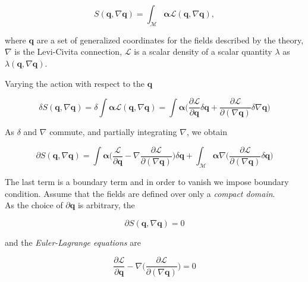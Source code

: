 {    \begin{equation}
    S(\boldsymbol{q}, \nabla\boldsymbol{q}) = \int_{\mathcal{M}}\boldsymbol{\alpha}\mathcal{L}(\boldsymbol{q}, \nabla\boldsymbol{q}),
    \end{equation}
    
    where $\boldsymbol{q}$ are a set of generalized coordinates for the fields described by the theory, $\nabla$ is the Levi-Civita connection, $\mathcal{L}$ is a scalar density of a scalar quantity $\lambda$ as $\lambda(\boldsymbol{q},\nabla\boldsymbol{q})$. 
    
    Varying the action with respect to the $\boldsymbol{q}$
    
    \begin{equation}
    \delta S(\boldsymbol{q}, \nabla\boldsymbol{q}) = \delta\int\boldsymbol{\alpha}\mathcal{L}(\boldsymbol{q}, \nabla\boldsymbol{q}) = \int\boldsymbol{\alpha}\Big(\frac{\partial\mathcal{L}}{\partial\boldsymbol{q}}\delta\boldsymbol{q}+\frac{\partial\mathcal{L}}{\partial(\nabla\boldsymbol{q})}\delta\nabla\boldsymbol{q}\Big)
    \end{equation}
    
    As $\delta$ and $\nabla$ commute, and partially integrating $\nabla$, we obtain
    
    \begin{equation}
    \partial S(\boldsymbol{q}, \nabla\boldsymbol{q}) = \int\boldsymbol{\alpha}\Big(\frac{\mathcal{L}}{\partial\boldsymbol{q}}-\nabla\frac{\partial \mathcal{L}}{\partial(\nabla\boldsymbol{q})}\Big)\delta\boldsymbol{q} + \int_{\mathcal{M}}\boldsymbol{\alpha}\nabla\Big(\frac{\partial\mathcal{L}}{\partial(\nabla\boldsymbol{q})}\delta\boldsymbol{q}\Big)
    \end{equation}
    
    The last term is a boundary term and in order to vanish we impose boundary condition. 
    Assume that the fields are defined over only a \textit{compact domain}. \\
    As the choice of $\partial\boldsymbol{q}$ is arbitrary, the 
    
    \begin{equation}
    \partial S(\boldsymbol{q}, \nabla\boldsymbol{q}) = 0
    \end{equation}
    
    and the \textit{Euler-Lagrange equations} are
    
    \begin{equation}
    \frac{\partial \mathcal{L}}{\partial\boldsymbol{q}} - \nabla\Big(\frac{\partial\mathcal{L}}{\partial(\nabla\boldsymbol{q})}\Big) = 0
    \label{eq:theory:eulerlagrange}
    \end{equation}
    
}
